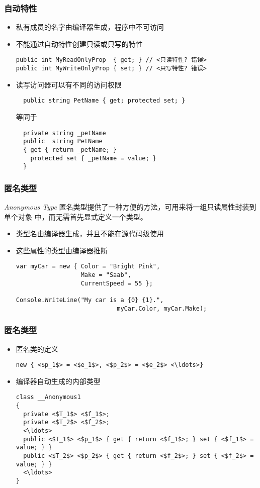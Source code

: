 \begin{frame}[fragile]
\frametitle{自动特性}
\begin{itemize}[<+->]
\setlength{\itemsep}{6pt plus 1pt}
\item 私有成员的名字由编译器生成，程序中不可访问
\item 不能通过自动特性创建只读或只写的特性
\begin{lstlisting}[escapeinside=<>]
public int MyReadOnlyProp  { get; } // <只读特性? 错误>
public int MyWriteOnlyProp { set; } // <只写特性? 错误>
\end{lstlisting}
\item 读写访问器可以有不同的访问权限
\begin{lstlisting}
  public string PetName { get; protected set; }
\end{lstlisting}
等同于
\begin{lstlisting}
  private string _petName
  public  string PetName
  { get { return _petName; }
    protected set { _petName = value; }
  }
\end{lstlisting}
\end{itemize}
\end{frame}


\begin{frame}[fragile]
\frametitle{匿名类型}
\begin{block}{\textit{Anonymous Type}}
  \CJKindent 匿名类型提供了一种方便的方法，可用来将一组只读属性封装到单个对象
  中，而无需首先显式定义一个类型。
\end{block}
\begin{itemize}
\item 类型名由编译器生成，并且不能在源代码级使用
\item 这些属性的类型由编译器推断
\pause
\begin{lstlisting}
var myCar = new { Color = "Bright Pink",
                  Make = "Saab",
                  CurrentSpeed = 55 };

Console.WriteLine("My car is a {0} {1}.",
                            myCar.Color, myCar.Make);
\end{lstlisting}
\end{itemize}
\end{frame}

\begin{frame}[fragile]
\frametitle{匿名类型}
\begin{itemize}
\item 匿名类的定义
\begin{lstlisting}[escapeinside=<>]
new { <$p_1$> = <$e_1$>, <$p_2$> = <$e_2$> <\ldots>}
\end{lstlisting}
\item 编译器自动生成的内部类型
\begin{lstlisting}[escapeinside=<>]
class __Anonymous1
{
  private <$T_1$> <$f_1$>;
  private <$T_2$> <$f_2$>;
  <\ldots>
  public <$T_1$> <$p_1$> { get { return <$f_1$>; } set { <$f_1$> = value; } }
  public <$T_2$> <$p_2$> { get { return <$f_2$>; } set { <$f_2$> = value; } }
  <\ldots>
}
\end{lstlisting}
\end{itemize}
\end{frame}

